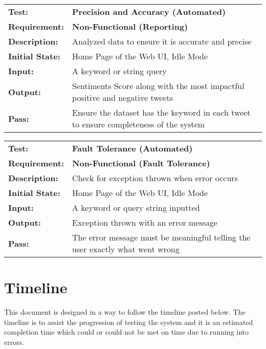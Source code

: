 \documentclass{article}
\begin{document}
	\begin{mdframed}[linewidth=1pt]%
	\begin{tabularx}{\textwidth}{@{}p{3cm}X@{}}
	{\bf Test:} & {\bf Precision and Accuracy (Automated)}\\[\baselineskip]
	{\bf Requirement:} & {\bf Non-Functional (Reporting)}\\[\baselineskip]
	{\bf Description:} & Analyzed data to ensure it is accurate and precise\\[0.5\baselineskip]
	{\bf Initial State:} &  Home Page of the Web UI, Idle Mode\\[0.5\baselineskip]
	{\bf Input:} &  A keyword or string query\\[0.5\baselineskip]
	{\bf Output:} & Sentiments Score along with the most impactful positive and negative tweets \\[0.5\baselineskip]
	{\bf Pass:} & Ensure the dataset has the keyword in each tweet to ensure completeness of the system
	\end{tabularx}
	\end{mdframed}


		
	\begin{mdframed}[linewidth=1pt]%
	\begin{tabularx}{\textwidth}{@{}p{3cm}X@{}}
	{\bf Test:} & {\bf Fault Tolerance (Automated)}\\[\baselineskip]
	{\bf Requirement:} & {\bf Non-Functional (Fault Tolerance)}\\[\baselineskip]
	{\bf Description:} & Check for exception thrown when error occurs\\[0.5\baselineskip]
	{\bf Initial State:} &  Home Page of the Web UI, Idle Mode\\[0.5\baselineskip]
	{\bf Input:} &  A keyword or query string inputted\\[0.5\baselineskip]
	{\bf Output:} & Exception thrown with an error message\\[0.5\baselineskip]
	{\bf Pass:} & The error message must be meaningful telling the user exactly what went wrong
	\end{tabularx}
	\end{mdframed}


	\newpage
	
	\section{Timeline}
	This document is designed in a way to follow the timeline posted below. The timeline is to assist the progression of testing the system and it is an estimated 		completion time which could or could not be met on time due to running into errors. \\
\end{document}
